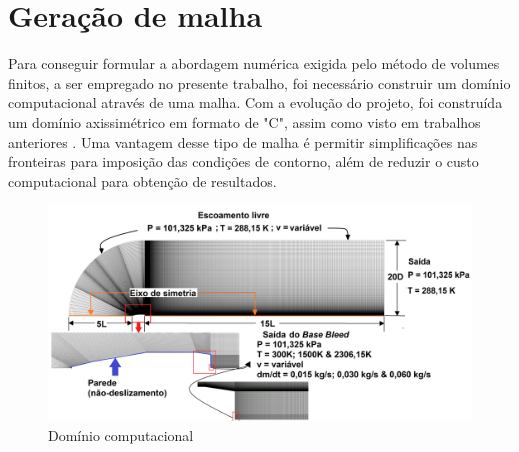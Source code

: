 
%

\section{Geração de malha}\label{sec:geracao-malha}

Para conseguir formular a abordagem numérica exigida pelo método de volumes finitos, a ser empregado no presente trabalho, foi necessário construir um domínio computacional através de uma malha. Com a evolução do projeto, foi construída um domínio axissimétrico em formato de "C", assim como visto em trabalhos anteriores \cite{Mahmoud2009,nicolas-perez_accuracy_2017}. Uma vantagem desse tipo de malha é permitir simplificações nas fronteiras para imposição das condições de contorno, além de reduzir o custo computacional para obtenção de resultados.

\begin{figure}[!ht]
	\centering
	\includegraphics[width=1.0\textwidth]{foto01-malha.png}
	\caption{Domínio computacional}
	\label{fig12:autor-malha}
\end{figure}

